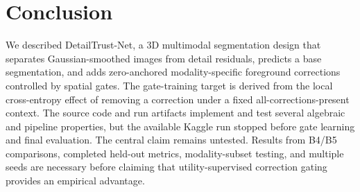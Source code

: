 \documentclass[conference]{IEEEtran}
\begin{document}
\section{Conclusion}
We described DetailTrust-Net, a 3D multimodal segmentation design that separates Gaussian-smoothed images from detail residuals, predicts a base segmentation, and adds zero-anchored modality-specific foreground corrections controlled by spatial gates. The gate-training target is derived from the local cross-entropy effect of removing a correction under a fixed all-corrections-present context. The source code and run artifacts implement and test several algebraic and pipeline properties, but the available Kaggle run stopped before gate learning and final evaluation. The central claim remains untested. Results from B4/B5 comparisons, completed held-out metrics, modality-subset testing, and multiple seeds are necessary before claiming that utility-supervised correction gating provides an empirical advantage.
\end{document}
